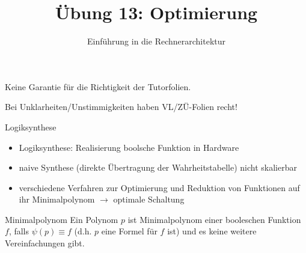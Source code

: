 

\renewcommand{\n}[1]{\overline{#1}}

\title{Übung 13: Optimierung}
\subtitle{Einführung in die Rechnerarchitektur}
\date{}




\maketitle

\begin{frame}[c, fragile]{}{}
	\begin{center}
		\LARGE  Keine Garantie für die Richtigkeit der Tutorfolien.

		\Large Bei Unklarheiten/Unstimmigkeiten haben VL/ZÜ-Folien recht!
	\end{center}
\end{frame}

\begin{frame}[fragile, c]{Logiksynthese}{}
	\begin{itemize}
		\item Logiksynthese: Realisierung boolsche Funktion in Hardware
		\item naive Synthese (direkte Übertragung der Wahrheitstabelle) nicht skalierbar
		\item verschiedene Verfahren zur Optimierung und Reduktion von Funktionen auf ihr Minimalpolynom $\rightarrow$ optimale Schaltung
	\end{itemize}
	\begin{block}{Minimalpolynom}
		Ein Polynom $p$ ist Minimalpolynom einer booleschen Funktion $f$, falls  $\psi(p) \equiv f$ (d.h. $p$ eine Formel für $f$ ist) und es keine weitere Vereinfachungen gibt.
	\end{block}
\end{frame}

